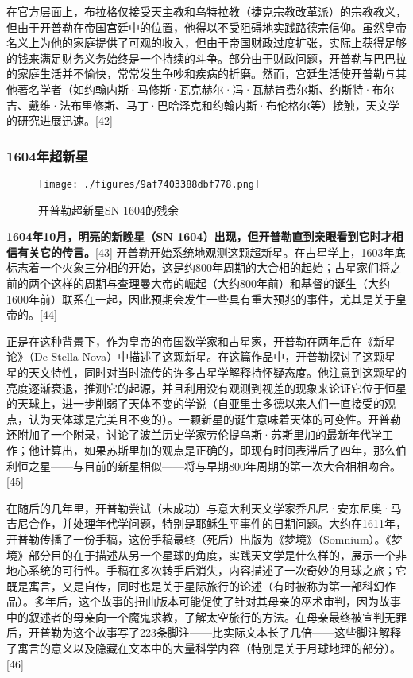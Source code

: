 在官方层面上，布拉格仅接受天主教和乌特拉教（捷克宗教改革派）的宗教教义，但由于开普勒在帝国宫廷中的位置，他得以不受阻碍地实践路德宗信仰。虽然皇帝名义上为他的家庭提供了可观的收入，但由于帝国财政过度扩张，实际上获得足够的钱来满足财务义务始终是一个持续的斗争。部分由于财政问题，开普勒与巴巴拉的家庭生活并不愉快，常常发生争吵和疾病的折磨。然而，宫廷生活使开普勒与其他著名学者（如约翰内斯·马修斯·瓦克赫尔·冯·瓦赫肯费尔斯、约斯特·布尔吉、戴维·法布里修斯、马丁·巴哈泽克和约翰内斯·布伦格尔等）接触，天文学的研究进展迅速。[42]
\subsubsection{1604年超新星}
\begin{figure}[ht]
\centering
\texttt{[image: ./figures/9af7403388dbf778.png]}
\caption{开普勒超新星SN 1604的残余} \label{fig_KPL1_7}
\end{figure}
\textbf{1604年10月，明亮的新晚星（SN 1604）出现，但开普勒直到亲眼看到它时才相信有关它的传言。}[43] 开普勒开始系统地观测这颗超新星。在占星学上，1603年底标志着一个火象三分相的开始，这是约800年周期的大合相的起始；占星家们将之前的两个这样的周期与查理曼大帝的崛起（大约800年前）和基督的诞生（大约1600年前）联系在一起，因此预期会发生一些具有重大预兆的事件，尤其是关于皇帝的。[44]

正是在这种背景下，作为皇帝的帝国数学家和占星家，开普勒在两年后在《新星论》（De Stella Nova）中描述了这颗新星。在这篇作品中，开普勒探讨了这颗星星的天文特性，同时对当时流传的许多占星学解释持怀疑态度。他注意到这颗星的亮度逐渐衰退，推测它的起源，并且利用没有观测到视差的现象来论证它位于恒星的天球上，进一步削弱了天体不变的学说（自亚里士多德以来人们一直接受的观点，认为天体球是完美且不变的）。一颗新星的诞生意味着天体的可变性。开普勒还附加了一个附录，讨论了波兰历史学家劳伦提乌斯·苏斯里加的最新年代学工作；他计算出，如果苏斯里加的观点是正确的，即现有时间表滞后了四年，那么伯利恒之星——与目前的新星相似——将与早期800年周期的第一次大合相相吻合。[45]

在随后的几年里，开普勒尝试（未成功）与意大利天文学家乔凡尼·安东尼奥·马吉尼合作，并处理年代学问题，特别是耶稣生平事件的日期问题。大约在1611年，开普勒传播了一份手稿，这份手稿最终（死后）出版为《梦境》（Somnium）。《梦境》部分目的在于描述从另一个星球的角度，实践天文学是什么样的，展示一个非地心系统的可行性。手稿在多次转手后消失，内容描述了一次奇妙的月球之旅；它既是寓言，又是自传，同时也是关于星际旅行的论述（有时被称为第一部科幻作品）。多年后，这个故事的扭曲版本可能促使了针对其母亲的巫术审判，因为故事中的叙述者的母亲向一个魔鬼求教，了解太空旅行的方法。在母亲最终被宣判无罪后，开普勒为这个故事写了223条脚注——比实际文本长了几倍——这些脚注解释了寓言的意义以及隐藏在文本中的大量科学内容（特别是关于月球地理的部分）。[46]
